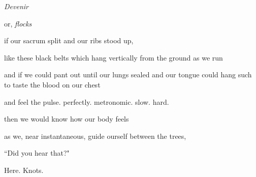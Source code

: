 \documentclass[11pt]{article}
\begin{document}
\begingroup
\begin{center}
\huge \textit{Devenir}
\end{center}
\endgroup

\begingroup
\begin{center}
or, \textit{flocks}
\end{center}
\endgroup

\vspace*{2\baselineskip}

\begingroup
\begin{center}
if our sacrum split and our ribs stood up,
\rightskip\leftskip
\end{center}
\endgroup

\begingroup
\begin{center}
like these black belts which hang vertically from the ground as we run
\rightskip\leftskip
\end{center}
\endgroup

\begingroup
\begin{center}
and if we could pant out until our lungs sealed and our tongue could hang such to taste the blood on our chest
\rightskip\leftskip
\end{center}
\endgroup

\begingroup
\begin{center}
and feel the pulse. perfectly. metronomic. slow. hard.
\rightskip\leftskip
\end{center}
\endgroup

\begingroup
\begin{center}
then we would know how our body feels
\rightskip\leftskip
\end{center}
\endgroup

\begingroup
\begin{center}
as we, near instantaneous, guide ourself between the trees,
\rightskip\leftskip
\end{center}
\endgroup

\vspace*{2\baselineskip}

\begingroup
\begin{center}
``Did you hear that?"
\end{center}
\endgroup

\vspace*{4\baselineskip}

\begingroup
\begin{center}
Here. Knots.
\rightskip\leftskip
\end{center}
\endgroup
\end{document}

